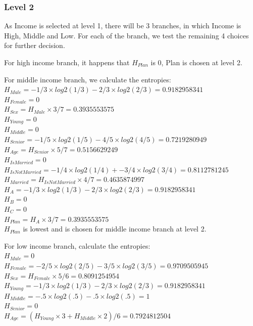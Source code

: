 \documentclass[12pt]{article}
\begin{document}
\subsubsection{Level 2}
As Income is selected at level 1, there will be 3 branches, in which Income is High, Middle and Low. For each of the branch, we test the remaining 4 choices for further decision.

For high income branch, it happens that $H_{Plan}$ is 0, Plan is chosen at level 2.

For middle income branch, we calculate the entropies:\\
$H_{Male} = - 1/3 × log2(1/3) - 2/3 × log2(2/3) = 0.9182958341$\\
$H_{Female} = 0$\\
$H_{Sex} = H_{Male} × 3/7 = 0.3935553575$\\

$H_{Young} = 0$\\
$H_{Middle} = 0$\\
$H_{Senior} = - 1/5 × log2(1/5) - 4/5 × log2(4/5) = 0.7219280949$\\
$H_{Age} = H_{Senior} × 5/7 = 0.5156629249$\\

$H_{IsMarried} = 0$\\
$H_{IsNotMarried} = - 1/4 × log2(1/4) + - 3/4 × log2(3/4) = 0.8112781245$\\
$H_{Married} = H_{IsNotMarried} × 4/7 = 0.4635874997$\\

$H_{A} = - 1/3 × log2(1/3) - 2/3 × log2(2/3) = 0.9182958341$\\
$H_{B} = 0$\\
$H_{C} = 0$\\
$H_{Plan} = H_{A} × 3/7 = 0.3935553575$\\

$H_{Plan}$ is lowest and is chosen for middle income branch at level 2.

For low income branch, calculate the entropies:\\
$H_{Male} = 0$\\
$H_{Female} = - 2/5 × log2(2/5) - 3/5 × log2(3/5) = 0.9709505945$\\
$H_{Sex} = H_{Female} × 5/6 = 0.8091254954$\\

$H_{Young} = - 1/3 × log2(1/3) - 2/3 × log2(2/3) = 0.9182958341$\\
$H_{Middle} = - .5 × log2(.5) - .5 × log2(.5) = 1$\\
$H_{Senior} = 0$\\
$H_{Age} = (H_{Young} × 3 + H_{Middle} × 2)/6 = 0.7924812504$\\
\end{document}
